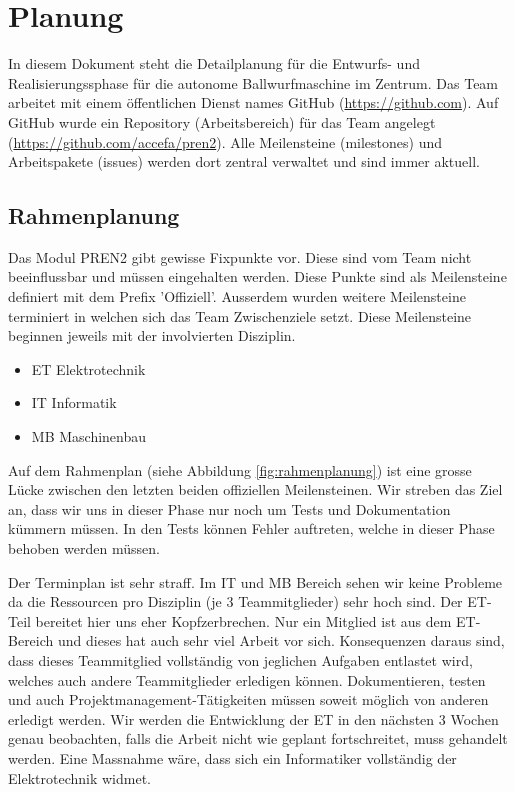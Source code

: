 \section{Planung}
In diesem Dokument steht die Detailplanung für die Entwurfs- und
Realisierungssphase für die autonome Ballwurfmaschine im Zentrum.
Das Team arbeitet mit einem öffentlichen Dienst names GitHub (\href{https://github.com}{https://github.com}).
Auf GitHub wurde ein Repository (Arbeitsbereich) für das Team angelegt
(\href{https://github.com/accefa/pren2}{https://github.com/accefa/pren2}). Alle Meilensteine (milestones) und Arbeitspakete (issues) werden dort zentral verwaltet und sind immer aktuell.

\subsection{Rahmenplanung}
Das Modul PREN2 gibt gewisse Fixpunkte vor. Diese sind vom Team nicht
beeinflussbar und müssen eingehalten werden. Diese Punkte sind als
Meilensteine definiert mit dem Prefix 'Offiziell'. Ausserdem wurden weitere
Meilensteine terminiert in welchen sich das Team Zwischenziele setzt. Diese Meilensteine beginnen jeweils mit der involvierten Disziplin.

\begin{itemize}
	\item ET Elektrotechnik
	\item IT Informatik
	\item MB Maschinenbau
\end{itemize}

Auf dem Rahmenplan (siehe Abbildung \ref{fig:rahmenplanung}) ist eine grosse Lücke zwischen den letzten beiden offiziellen Meilensteinen. Wir streben das Ziel an, dass wir uns in dieser Phase nur noch um Tests und Dokumentation kümmern müssen. In den Tests können Fehler auftreten, welche in dieser Phase behoben werden müssen.

Der Terminplan ist sehr straff. Im IT und MB Bereich sehen wir keine Probleme da die Ressourcen pro Disziplin (je 3 Teammitglieder) sehr hoch sind. Der ET-Teil bereitet hier uns eher Kopfzerbrechen. Nur ein Mitglied ist aus dem ET-Bereich und dieses hat auch sehr viel Arbeit vor sich. Konsequenzen
daraus sind, dass dieses Teammitglied vollständig von jeglichen Aufgaben
entlastet wird, welches auch andere Teammitglieder erledigen können.
Dokumentieren, testen und auch Projektmanagement-Tätigkeiten müssen soweit möglich von anderen erledigt werden. Wir werden die Entwicklung der ET in den nächsten 3 Wochen genau beobachten, falls die Arbeit nicht wie geplant fortschreitet, muss gehandelt werden. Eine Massnahme wäre, dass sich ein Informatiker vollständig der Elektrotechnik widmet.

